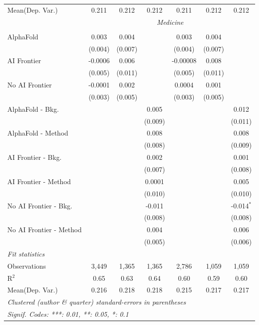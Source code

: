 \begin{tabular}{lcccccc}
Mean(Dep. Var.) & 0.211 & 0.212 & 0.212 & 0.211 & 0.212 & 0.212 \\
 & \multicolumn{6}{c}{\textit{Medicine}} \\ \\
   AlphaFold               & 0.003   & 0.004   &         & 0.003    & 0.004   &   \\   
                           & (0.004) & (0.007) &         & (0.004)  & (0.007) &   \\   
   AI Frontier             & -0.0006 & 0.006   &         & -0.00008 & 0.008   &   \\   
                           & (0.005) & (0.011) &         & (0.005)  & (0.011) &   \\   
   No AI Frontier          & -0.0001 & 0.002   &         & 0.0004   & 0.001   &   \\   
                           & (0.003) & (0.005) &         & (0.003)  & (0.005) &   \\   
   AlphaFold - Bkg.        &         &         & 0.005   &          &         & 0.012\\   
                           &         &         & (0.009) &          &         & (0.011)\\   
   AlphaFold - Method      &         &         & 0.008   &          &         & 0.008\\   
                           &         &         & (0.008) &          &         & (0.009)\\   
   AI Frontier - Bkg.      &         &         & 0.002   &          &         & 0.001\\   
                           &         &         & (0.007) &          &         & (0.008)\\   
   AI Frontier - Method    &         &         & 0.0001  &          &         & 0.005\\   
                           &         &         & (0.010) &          &         & (0.010)\\   
   No AI Frontier - Bkg.   &         &         & -0.011  &          &         & -0.014$^{*}$\\   
                           &         &         & (0.008) &          &         & (0.008)\\   
   No AI Frontier - Method &         &         & 0.004   &          &         & 0.006\\   
                           &         &         & (0.005) &          &         & (0.006)\\   
   \midrule
   \emph{Fit statistics}\\
   Observations            & 3,449   & 1,365   & 1,365   & 2,786    & 1,059   & 1,059\\  
   R$^2$                   & 0.65    & 0.63    & 0.64    & 0.60     & 0.59    & 0.60\\  
Mean(Dep. Var.) & 0.216 & 0.218 & 0.218 & 0.215 & 0.217 & 0.217 \\
   \midrule \midrule
   \multicolumn{7}{l}{\emph{Clustered (author \& quarter) standard-errors in parentheses}}\\
   \multicolumn{7}{l}{\emph{Signif. Codes: ***: 0.01, **: 0.05, *: 0.1}}\\
\end{tabular}
\par\endgroup
